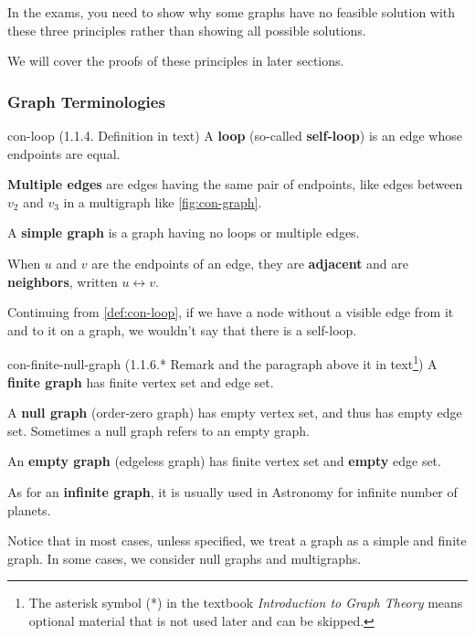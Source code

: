 \documentclass[../src/handouts/main.tex]{subfiles}
\begin{document}
In the exams, you need to show why some graphs have no feasible solution with these three principles rather than showing all possible solutions.

We will cover the proofs of these principles in later sections. %

\subsubsection{Graph Terminologies}

\begin{definition}{}{con-loop}
  (1.1.4. Definition in text)
  A \textbf{loop} (so-called \textbf{self-loop}) is an edge whose endpoints are equal.

  \textbf{Multiple edges} are edges having the same pair of endpoints, like edges between $v_2$ and $v_3$ in a multigraph like \cref{fig:con-graph}.

  A \textbf{simple graph} is a graph having no loops or multiple edges.

  When $u$ and $v$ are the endpoints of an edge, they are \textbf{adjacent} and are \textbf{neighbors}, written $u \leftrightarrow v$.
\end{definition}

Continuing from \cref{def:con-loop}, if we have a node without a visible edge from it and to it on a graph, we wouldn't say that there is a self-loop.

\begin{definition}{}{con-finite-null-graph}
  (1.1.6.* Remark and the paragraph above it in text\footnote{The asterisk symbol (*) in the textbook \textit{Introduction to Graph Theory} means optional material that is not used later and can be skipped.})
  A \textbf{finite graph} has finite vertex set and edge set.

  A \textbf{null graph} (order-zero graph) has empty vertex set, and thus has empty edge set. Sometimes a null graph refers to an empty graph.

  An \textbf{empty graph} (edgeless graph) has finite vertex set and \textbf{empty} edge set.

  As for an \textbf{infinite graph}, it is usually used in Astronomy for infinite number of planets.
\end{definition}

Notice that in most cases, unless specified, we treat a graph as a simple and finite graph. In some cases, we consider null graphs and multigraphs.
\end{document}
